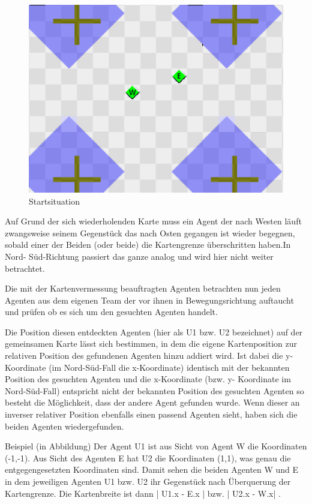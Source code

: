 \documentclass[runningheads]{llncs}
\begin{document}
	\begin{figure}
		\centering
		\includegraphics[scale=0.5]{./Referenzen/Measurement_Step1.png}
		\caption{Startsituation}
		\label{measurement1}
	\end{figure}
	
	Auf Grund der sich wiederholenden Karte muss ein Agent der nach Westen läuft zwangsweise seinem Gegenstück das nach Osten gegangen ist wieder begegnen, sobald einer der Beiden (oder beide) die Kartengrenze überschritten haben.In Nord- Süd-Richtung passiert das ganze analog und wird hier nicht weiter betrachtet.
	
	Die mit der Kartenvermessung beauftragten Agenten betrachten nun jeden Agenten aus dem eigenen Team der vor ihnen in Bewegungsrichtung auftaucht und prüfen ob es sich um den gesuchten Agenten handelt.
	
	Die Position diesen entdeckten Agenten (hier als U1 bzw. U2 bezeichnet) auf der gemeinsamen Karte lässt sich bestimmen, in dem die eigene Kartenposition zur relativen Position des gefundenen Agenten hinzu addiert wird. Ist dabei die y-Koordinate (im Nord-Süd-Fall die x-Koordinate) identisch mit der bekannten Position des gesuchten Agenten und die x-Koordinate (bzw. y- Koordinate im Nord-Süd-Fall) entspricht nicht der bekannten Position des gesuchten Agenten so besteht die Möglichkeit, dass der andere Agent gefunden wurde. Wenn dieser an inverser relativer Position ebenfalls einen passend Agenten sieht, haben sich die beiden Agenten wiedergefunden.
	
	Beispiel (in Abbildung) 
	Der Agent U1 ist aus Sicht von Agent W die Koordinaten (-1,-1). Aus Sicht des Agenten E hat U2 die Koordinaten (1,1), was genau die entgegengesetzten Koordinaten sind. Damit sehen die beiden Agenten W und E in dem jeweiligen Agenten U1 bzw. U2 ihr Gegenstück nach Überquerung der Kartengrenze. Die Kartenbreite ist dann | U1.x - E.x | bzw. | U2.x - W.x| .
	
\end{document}

